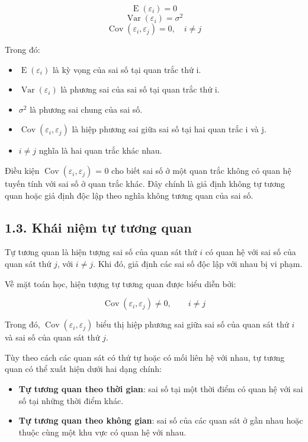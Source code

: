 \documentclass[12pt,a4paper]{article}
\begin{document}
\[
\operatorname{E}(\varepsilon_i)=0
\]
\[
\operatorname{Var}(\varepsilon_i)=\sigma^2
\]
\[
\operatorname{Cov}(\varepsilon_i,\varepsilon_j)=0,\quad i\neq j
\]

Trong đó:

\begin{itemize}
\item
  \(\operatorname{E}(\varepsilon_i)\) là kỳ vọng của sai số tại quan trắc thứ i.
\item
  \(\operatorname{Var}(\varepsilon_i)\) là phương sai của sai số tại quan trắc thứ i.
\item
  \(\sigma^2\) là phương sai chung của sai số.
\item
  \(\operatorname{Cov}(\varepsilon_i,\varepsilon_j)\) là hiệp phương sai giữa sai số tại hai quan trắc i và j.
\item
  \(i\neq j\) nghĩa là hai quan trắc khác nhau.
\end{itemize}

Điều kiện \(\operatorname{Cov}(\varepsilon_i,\varepsilon_j)\) = 0 cho biết sai số ở một quan trắc không có quan
hệ tuyến tính với sai số ở quan trắc khác. Đây chính là giả định không
tự tương quan hoặc giả định độc lập theo nghĩa không tương quan của sai
số.

\subsection{1.3. Khái niệm tự tương quan}

Tự tương quan là hiện tượng sai số của quan sát thứ $i$ có quan hệ với sai số của quan sát thứ $j$, với $i \neq j$. Khi đó, giả định các sai số độc lập với nhau bị vi phạm.

Về mặt toán học, hiện tượng tự tương quan được biểu diễn bởi:

\[
\operatorname{Cov}(\varepsilon_i,\varepsilon_j) \neq 0,
\qquad i \neq j
\]

Trong đó, $\operatorname{Cov}(\varepsilon_i,\varepsilon_j)$ biểu thị hiệp phương sai giữa sai số của quan sát thứ $i$ và sai số của quan sát thứ $j$.

Tùy theo cách các quan sát có thứ tự hoặc có mối liên hệ với nhau, tự tương quan có thể xuất hiện dưới hai dạng chính:

\begin{itemize}
    \item \textbf{Tự tương quan theo thời gian}: sai số tại một thời điểm có quan hệ với sai số tại những thời điểm khác.
    
    \item \textbf{Tự tương quan theo không gian}: sai số của các quan sát ở gần nhau hoặc thuộc cùng một khu vực có quan hệ với nhau.
\end{itemize}
\end{document}
